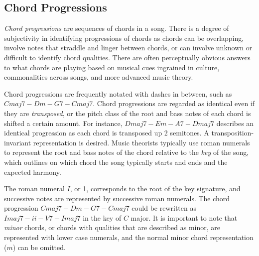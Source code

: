 \subsection{Chord Progressions}

\textit{Chord progressions} are sequences of chords in a song. There is a degree of subjectivity in identifying progressions of chords as chords can be overlapping, involve notes that straddle and linger between chords, or can involve unknown or difficult to identify chord qualities. There are often perceptually obvious answers to what chords are playing based on musical cues ingrained in culture, commonalities across songs, and more advanced music theory.

Chord progressions are frequently notated with dashes in between, such as $Cmaj7 - Dm - G7 - Cmaj7$. Chord progressions are regarded as identical even if they are \textit{transposed}, or the pitch class of the root and bass notes of each chord is shifted a certain amount. For instance, $Dmaj7 - Em - A7 - Dmaj7$ describes an identical progression as each chord is transposed up 2 semitones. A transposition-invariant representation is desired. Music theorists typically use roman numerals to represent the root and bass notes of the chord relative to the \textit{key} of the song, which outlines on which chord the song typically starts and ends and the expected harmony.

The roman numeral $I$, or 1, corresponds to the root of the key signature, and successive notes are represented by successive roman numerals. The chord progression $Cmaj7 - Dm - G7 - Cmaj7$ could be rewritten as $Imaj7 - ii - V7 - Imaj7$ in the key of $C$ major. It is important to note that \textit{minor} chords, or chords with qualities that are described as minor, are represented with lower case numerals, and the normal minor chord representation ($m$) can be omitted.